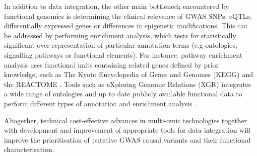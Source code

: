 In addition to data integration, the other main bottleneck encountered by functional genomics is determining the clinical relevance of GWAS SNPs, eQTLs, differentially expressed genes or differences in epigenetic modifications. This can be addressed by performing enrichment analysis, which tests for statistically significant over-representation of particular annotation terms (e.g ontologies, signalling pathways or functional elements). For instance, pathway enrichment analysis uses functional units containing related genes defined by prior knowledge, such as The Kyoto Encyclopedia of Genes and Genomes (KEGG) and the REACTOME \parencite{Kanehisa2000, Fabregat2018}. Tools such as eXploring Genomic Relations (XGR) integrates a wide range of ontologies and up to date publicly available functional data to perform different types of annotation and enrichment analysis \parencite{Fang2016}. 

Altogether, technical cost-effective  advances in multi-omic technologies together with development and improvement of appropriate tools for data integration will improve the prioritisation of putative GWAS causal variants and their functional characterisation.




